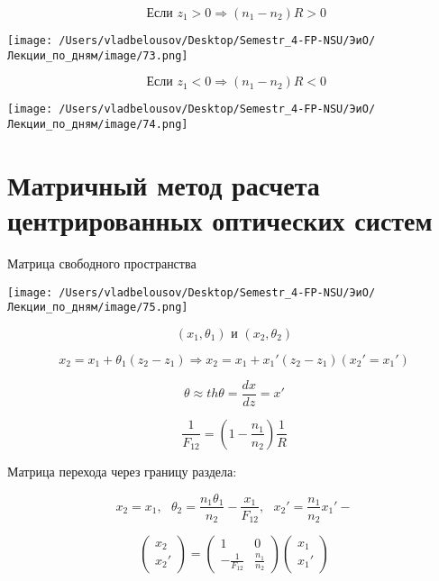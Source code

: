 \documentclass[12pt, a4paper]{report}
\begin{document}
\[ \text{ Если } z_1>0 \Rightarrow (n_1 - n_2 )R >0 \] 

\begin{center}
    \texttt{[image: /Users/vladbelousov/Desktop/Semestr\_4-FP-NSU/ЭиО/Лекции\_по\_дням/image/73.png]}
\end{center} 

\[ \text{ Если } z_1< 0 \Rightarrow (n_1 -n_2 )R < 0   \] 

\begin{center}
    \texttt{[image: /Users/vladbelousov/Desktop/Semestr\_4-FP-NSU/ЭиО/Лекции\_по\_дням/image/74.png]}
\end{center} 

\section{Матричный метод расчета центрированных оптических систем}

Матрица свободного пространства 

\begin{center}
    \texttt{[image: /Users/vladbelousov/Desktop/Semestr\_4-FP-NSU/ЭиО/Лекции\_по\_дням/image/75.png]}
\end{center} 

\[ (x_1 , \theta_1 ) \text{ и  } (x_2 , \theta_2 )  \] 

\[ x_2 = x_1 + \theta_1 (z_2 -z_1 ) \Rightarrow x_2 = x_1 + x_1 ' (z_2 -z_1  ) (x_2 ' = x_1 ') \] 

\[ \theta \approx th \theta = \frac{dx}{dz } = x ' \] 

\[ \frac{1}{F_{12} } = \left(  1 - \frac{n_1}{n_2 }  \right) \frac{1}{R}   \] 

Матрица перехода через границу раздела: 

\[ x_2 = x_1  , \text{ } \theta_2 = \frac{n_1 \theta_1 }{n_2 } - \frac{x_1}{F_{12} }  , \text{ } x_2 ' = \frac{n_1}{n_2 }x_1 ' -   \] 

\[ \begin{pmatrix}
x_2     \\
x_2 '
\end{pmatrix} = \begin{pmatrix}
1  & 0 \\
-\frac{1}{F_{12} }  & \frac{n_1}{n_2} 
\end{pmatrix} \begin{pmatrix}
x_1     \\
x_1' 
\end{pmatrix} \] 
\end{document}

